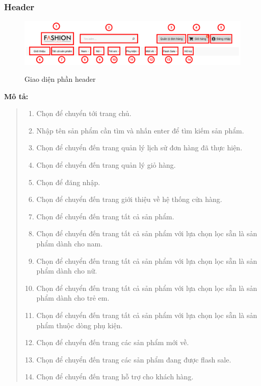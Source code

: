 \subsubsection{Header}
\begin{figure}[!htp]
    \centering
    \includegraphics[width=5in]{img/UI/customer/header.png}
    \label{6}
    \newline
    \caption{Giao diện phần header}
\end{figure}
\textbf{Mô tả:}
\begin{quote}
    \begin{enumerate}
        \item Chọn để chuyển tới trang chủ.
        \item Nhập tên sản phẩm cần tìm và nhấn enter để tìm kiếm sản phẩm.
        \item Chọn để chuyển đến trang quản lý lịch sử đơn hàng đã thực hiện.
        \item Chọn để chuyển đến trang quản lý giỏ hàng.
        \item Chọn để đăng nhập.
        \item Chọn để chuyển đến trang giới thiệu về hệ thống cửa hàng.
        \item Chọn để chuyển đến trang tất cả sản phẩm.
        \item Chọn để chuyển đến trang tất cả sản phẩm với lựa chọn lọc sẵn là sản phẩm dành cho nam.
        \item Chọn để chuyển đến trang tất cả sản phẩm với lựa chọn lọc sẵn là sản phẩm dành cho nữ.
        \item Chọn để chuyển đến trang tất cả sản phẩm với lựa chọn lọc sẵn là sản phẩm dành cho trẻ em.
        \item Chọn để chuyển đến trang tất cả sản phẩm với lựa chọn lọc sẵn là sản phẩm thuộc dòng phụ kiện.
        \item Chọn để chuyển đến trang các sản phẩm mới về.
        \item Chọn để chuyển đến trang các sản phẩm đang được flash sale.
        \item Chọn để chuyển đến trang hỗ trợ cho khách hàng.
    \end{enumerate}
\end{quote}

